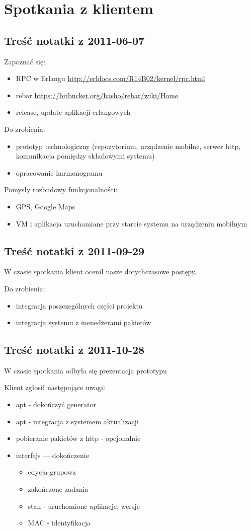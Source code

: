 \documentclass[polish,12pt]{aghthesis} \usepackage[utf8]{inputenc}
\begin{document}
\section{Spotkania z klientem}
\subsection{Treść notatki z 2011-06-07}
Zapoznać się:
\begin{itemize}
\item RPC w Erlangu \url{http://erldocs.com/R14B02/kernel/rpc.html}
\item rebar \url{https://bitbucket.org/basho/rebar/wiki/Home}
\item release, update aplikacji erlangowych
\end{itemize}
Do zrobienia:
\begin{itemize}
\item prototyp technologiczny (repozytorium, urządzenie mobilne, serwer http, komunikacja pomiędzy składowymi systemu)
\item opracowanie harmonogramu
\end{itemize}
Pomysły rozbudowy funkcjonalności:
\begin{itemize}
\item GPS, Google Maps
\item VM i aplikacja uruchamiane przy starcie systemu na urządzeniu mobilnym
\end{itemize}
\subsection{Treść notatki z 2011-09-29}
W czasie spotkania klient ocenił nasze dotychczasowe postępy.

Do zrobienia:
\begin{itemize}
\item integracja poszczególnych części projektu
\item integracja systemu z menedżerami pakietów
\end{itemize}

\subsection{Treść notatki z 2011-10-28}
W czasie spotkania odbyła się prezentacja prototypu

Klient zgłosił następujące uwagi:
\begin{itemize}
  \item apt - dokończyć generator
  \item apt - integracja z systemem aktualizacji
  \item pobieranie pakietów z http - opcjonalnie
  \item interfejs --- dokończenie
    \begin{itemize}
    \item edycja grupowa
    \item zakończone zadania
    \item stan - uruchomione aplikacje, wersje
    \item MAC - identyfikacja
    \end{itemize}
\end{itemize}
\end{document}
